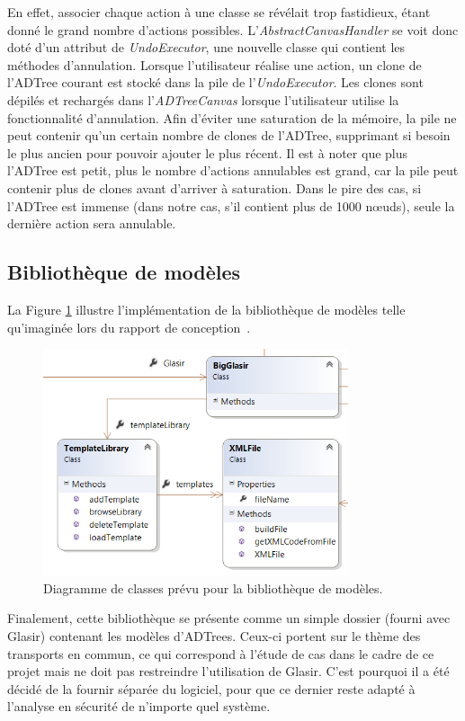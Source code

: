        En effet, associer chaque action à une classe se révélait trop fastidieux, étant donné le grand nombre d'actions possibles. L'\emph{AbstractCanvasHandler} se voit donc doté d'un attribut de \emph{UndoExecutor}, une nouvelle classe qui contient les méthodes d'annulation. Lorsque l'utilisateur réalise une action, un clone de l'ADTree courant est stocké dans la pile de l'\emph{UndoExecutor}. Les clones sont dépilés et rechargés dans l'\emph{ADTreeCanvas} lorsque l'utilisateur utilise la fonctionnalité d'annulation. Afin d'éviter une saturation de la mémoire, la pile ne peut contenir qu'un certain nombre de clones de l'ADTree, supprimant si besoin le plus ancien pour pouvoir ajouter le plus récent. Il est à noter que plus l'ADTree est petit, plus le nombre d'actions annulables est grand, car la pile peut contenir plus de clones avant d'arriver à saturation. Dans le pire des cas, si l'ADTree est immense (dans notre cas, s'il contient plus de 1000 n\oe{}uds), seule la dernière action sera annulable. 

	\subsection{Bibliothèque de modèles}
    \label{ssec:bib}
		La {\sc Figure} \ref{fig:library} illustre l'implémentation de la bibliothèque de modèles telle qu'imaginée lors du rapport de conception~\cite{conception}. 
		
		\begin{figure}[H]
            \centering
                \includegraphics[width=0.8\textwidth]{figure/library.png}
            \caption{Diagramme de classes prévu pour la bibliothèque de modèles.}
            \label{fig:library}
        \end{figure}

        Finalement, cette bibliothèque se présente comme un simple dossier (fourni avec Glasir) contenant les modèles d'ADTrees. Ceux-ci portent sur le thème des transports en commun, ce qui correspond à l'étude de cas dans le cadre de ce projet mais ne doit pas restreindre l'utilisation de Glasir. C'est pourquoi il a été décidé de la fournir séparée du logiciel, pour que ce dernier reste adapté à l'analyse en sécurité de n'importe quel système.